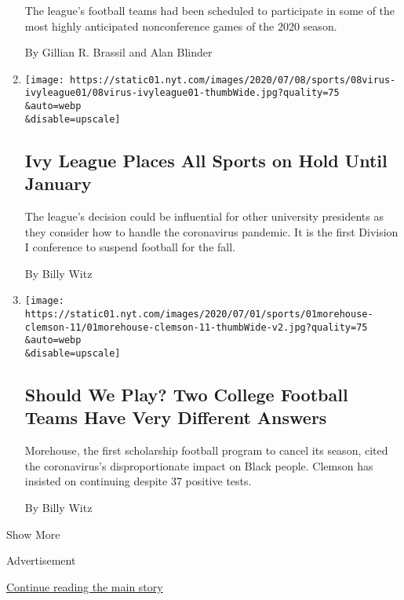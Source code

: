 \begin{enumerate}
  The league's football teams had been scheduled to participate in some
  of the most highly anticipated nonconference games of the 2020 season.

  By Gillian R. Brassil and Alan Blinder
\item
  \href{/2020/07/08/sports/ncaafootball/ivy-league-fall-sports-football-coronavirus.html}{}

  \texttt{[image: https://static01.nyt.com/images/2020/07/08/sports/08virus-ivyleague01/08virus-ivyleague01-thumbWide.jpg?quality=75\\\&auto=webp\\\&disable=upscale]}

  \hypertarget{ivy-league-places-all-sports-on-hold-until-january}{%
  \subsection{Ivy League Places All Sports on Hold Until
  January}\label{ivy-league-places-all-sports-on-hold-until-january}}

  The league's decision could be influential for other university
  presidents as they consider how to handle the coronavirus pandemic. It
  is the first Division I conference to suspend football for the fall.

  By Billy Witz
\item
  \href{/2020/07/01/sports/ncaafootball/coronavirus-college-football-hbcus-clemson.html}{}

  \texttt{[image: https://static01.nyt.com/images/2020/07/01/sports/01morehouse-clemson-11/01morehouse-clemson-11-thumbWide-v2.jpg?quality=75\\\&auto=webp\\\&disable=upscale]}

  \hypertarget{should-we-play-two-college-football-teams-have-very-different-answers}{%
  \subsection{Should We Play? Two College Football Teams Have Very
  Different
  Answers}\label{should-we-play-two-college-football-teams-have-very-different-answers}}

  Morehouse, the first scholarship football program to cancel its
  season, cited the coronavirus's disproportionate impact on Black
  people. Clemson has insisted on continuing despite 37 positive tests.

  By Billy Witz
\end{enumerate}

Show More

Advertisement

\protect\hyperlink{after-mid1}{Continue reading the main story}

